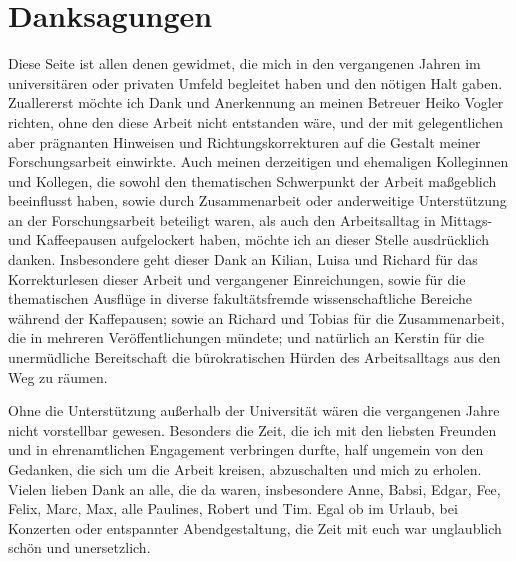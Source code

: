 \documentclass[document.tex]{subfiles}
\begin{document}
    \chapter*{Danksagungen}
    Diese Seite ist allen denen gewidmet, die mich in den vergangenen Jahren im universitären oder privaten Umfeld begleitet haben und den nötigen Halt gaben.
    Zuallererst möchte ich Dank und Anerkennung an meinen Betreuer Heiko Vogler richten, ohne den diese Arbeit nicht entstanden wäre, und der mit gelegentlichen aber prägnanten Hinweisen und Richtungskorrekturen auf die Gestalt meiner Forschungsarbeit einwirkte.
    Auch meinen derzeitigen und ehemaligen Kolleginnen und Kollegen, die sowohl den thematischen Schwerpunkt der Arbeit maßgeblich beeinflusst haben, sowie durch Zusammenarbeit oder anderweitige Unterstützung an der Forschungsarbeit beteiligt waren, als auch den Arbeitsalltag in Mittags- und Kaffeepausen aufgelockert haben, möchte ich an dieser Stelle ausdrücklich danken.
    Insbesondere geht dieser Dank an Kilian, Luisa und Richard für das Korrekturlesen dieser Arbeit und vergangener Einreichungen, sowie für die thematischen Ausflüge in diverse fakultätsfremde wissenschaftliche Bereiche während der Kaffepausen; sowie an Richard und Tobias für die Zusammenarbeit, die in mehreren Veröffentlichungen mündete; und natürlich an Kerstin für die unermüdliche Bereitschaft die bürokratischen Hürden des Arbeitsalltags aus den Weg zu räumen.

    Ohne die Unterstützung außerhalb der Universität wären die vergangenen Jahre nicht vorstellbar gewesen.
    Besonders die Zeit, die ich mit den liebsten Freunden und in ehrenamtlichen Engagement verbringen durfte, half ungemein von den Gedanken, die sich um die Arbeit kreisen, abzuschalten und mich zu erholen.
    Vielen lieben Dank an alle, die da waren, insbesondere Anne, Babsi, Edgar, Fee, Felix, Marc, Max, alle Paulines, Robert und Tim.
    Egal ob im Urlaub, bei Konzerten oder entspannter Abendgestaltung, die Zeit mit euch war unglaublich schön und unersetzlich.
\end{document}
